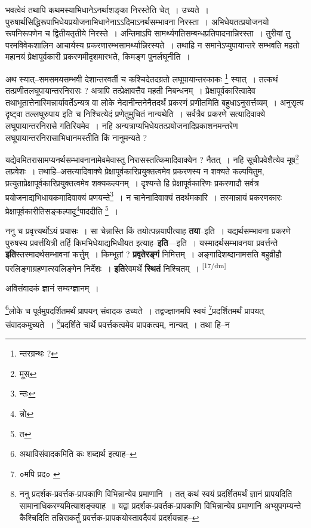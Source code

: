 \documentclass[article,12pt,a4paper]{memoir}
\begin{document}
	  \pstart भवत्वेवं तथापि कथमस्याभिधानेऽनर्थाशङ्का निरस्तेति चेत् । उच्यते । पुरुषार्थसिद्धिरूपाभिधेयप्रयोजनाभिधानेनाऽऽदिमाऽनर्थसम्भावना निरस्ता । अभिधेयतत्प्रयोजनयो रूपनिरूपणेन च द्वितीयतृतीये निरस्ते । अन्तिमाऽपि सामर्थ्यगतिसम्बन्धप्रतिपादनान्निरस्ता । तुरीयां तु परमविवेकशालिन आचार्यस्य प्रकरणारम्भसामर्थ्यान्निरस्यते । तथाहि न समानेऽप्युपायान्तरे सम्भवति महतो महानयं प्रेक्षापूर्वकारी प्रकरणमीदृशमारभते, किमङ्ग पुनर्लघूनीति ।
	\pend
      

	  \pstart अथ स्यात्--समसमयसम्भवी देशान्तरवर्ती च कश्चिदेतदग्रतो लघूपायान्तरकाकः \footnote{न्तरग्रन्थः ?} स्यात् । तत्कथं तत्प्रणीतलघूपायान्तरनिरासः ? अत्रापि तत्प्रेक्षावत्तैव महती निबन्धनम् । प्रेक्षापूर्वकारित्वादेव तथाभूतात्तेनास्मिन्नार्यावर्तेऽन्यत्र वा लोके नेदानीन्तनेनैतदर्थं प्रकरणं प्रणीतमिति बहुधाऽनुसर्त्तव्यम् । अनुसृत्य दृष्ट्वा तल्लघुरुपाय इति च निश्चित्येदं प्रणेतुमुचितं नान्यथेति । सर्वत्रैव प्रकरणे सत्यादिवाक्ये लघूपायान्तरनिरासे गतिरियमेव । नहि अन्यत्राप्यभिधेयतत्प्रयोजनादिप्रकाशनमन्तरेण लघूपायान्तरनिरासाभिधानमस्तीति किं नानुमन्यते ?
	\pend
      

	  \pstart यद्येवमितरासामप्यनर्थसम्भावनानामेवमेवास्तु निरासस्तत्किमादिवाक्येन ? नैतत् । नहि सूचीप्रवेशैत्येव मूष\footnote{मूस} लप्रवेशः । तथाहि--असत्यादिवाक्ये प्रेक्षापूर्वकारिप्रयुक्तत्वमेव प्रकरणस्य न शक्यते कल्पयितुम, प्रत्युताप्रेक्षापूर्वकारिप्रयुक्तत्वमेव शक्यकल्पनम् । दृश्यन्ते हि प्रेक्षापूर्वकारिणः प्रकरणादौ सर्वत्र प्रयोजनाद्यभिधायकमादिवाक्यं प्रणयन्ते\footnote{न्तः} । न चानेनादिवाक्यं तदर्थमकारि । तस्मान्नायं प्रकरणकारः प्रेक्षापूर्वकारीतिसङ्कल्पादु\footnote{न्नो}पाददीति \footnote{त} ।
	\pend
      

	  \pstart ननु च प्रवृत्त्यर्थोऽयं प्रयासः । सा चेन्नास्ति किं तयोत्पन्नयापीत्याह \textbf{तया}--इति । यद्यर्थसम्भावना प्रकरणे पुरुषस्य प्रवर्त्तयित्री तर्हि किमभिधेयाद्यभिधीयत इत्याह--\textbf{इति}—इति । यस्मादर्थसम्भावनया प्रवर्त्तन्ते \textbf{इति}स्तस्मादर्थसम्भावनां कर्त्तुम् । किम्भूतां ? \textbf{प्रवृतेरङ्गं} निमित्तम् । अङ्गादिशब्दानामसति बहुव्रीहौ परलिङ्गाग्रहणात्स्वलिङ्गेन निर्देशः । \textbf{इति}रेवमर्थे \textbf{स्थितं} निश्चितम् ।
	\pend
      \leavevmode\textsuperscript{\rmlatinfont\tiny [17/dm]}

	  \pstart अविसंवादकं ज्ञानं सम्यग्ज्ञानम् ।
	\pend
       

	  \pstart \footnote{अथाविसंवादकमिति कः शब्दार्थ इत्याह--\cite{dp-msD-n}}लोके च पूर्वमुपदर्शितमर्थं प्रापयन् संवादक उच्यते । तद्वज्ज्ञानमपि स्वयं \footnote{०मपि प्रद० \cite{dp-msA} \cite{dp-msC} \cite{dp-msD} \cite{dp-edP} \cite{dp-edE}}प्रदर्शितमर्थं प्रापयत् संवादकमुच्यते । \footnote{ननु प्रदर्शक-प्रवर्त्तक-प्रापकाणि विभिन्नान्येव प्रमाणानि । तत् कथं स्वयं प्रदर्शितमर्थं ज्ञानं प्रापयदिति सामानाधिकरण्यमित्याशङ्क्याह ॥ यद्वा प्रदर्शक-प्रवर्तक-प्रापकाणि विभिन्नान्येव प्रमाणानि अभ्युपगम्यन्ते कैश्चिदिति तन्निराकर्तुं प्रवर्त्तक-प्रापकयोस्तावदैवयं प्रदर्शयन्नाह--\cite{dp-msD-n}}प्रदर्शिते चार्थे प्रवर्त्तकत्वमेव प्रापकत्वम्, नान्यत् । तथा हि--न
	\pend
      
\end{document}
